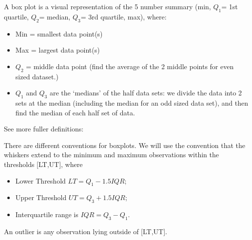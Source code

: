 \documentclass[t,xcolor=pdftex,dvipsnames,table]{beamer}\usepackage[]{graphicx}\usepackage[]{color}
\begin{document}
\begin{frame}[fragile]{}
\vspace{.5cm}
A box plot is a visual representation of the 5 number summary
(min, $Q_1$= 1st quartile, $Q_2$= median, $Q_3$= 3rd quartile, max), where:

\begin{itemize}
\item Min = smallest data point(s) \\
\item Max = largest data point(s) \\
\item $Q_2$ = middle data point (find the average of the 2 middle points for even sized dataset.) \\
\item $Q_{1}$ and $Q_{3}$ are the `medians' of the half data sets: we divide the data into 2 sets at the median (including the median for an odd sized data set), and then find the median of each half set of data.
\end{itemize}

See more fuller definitions:  \hyperlink{Quartiles}{} 

\end{frame}


\begin{frame}[fragile]{}

There are different conventions for boxplots. We will use the convention that the whiskers extend to the minimum and maximum observations within the thresholds [LT,UT], where 
\begin{itemize}
\item Lower Threshold $LT=Q_1-1.5IQR$;
\item Upper Threshold $UT=Q_3+ 1.5IQR$;
\item Interquartile range is $IQR=Q_3-Q_1$.
\end{itemize}

\vspace{.5cm}
An outlier is any observation lying outside of [LT,UT].
\end{frame}
\end{document}
